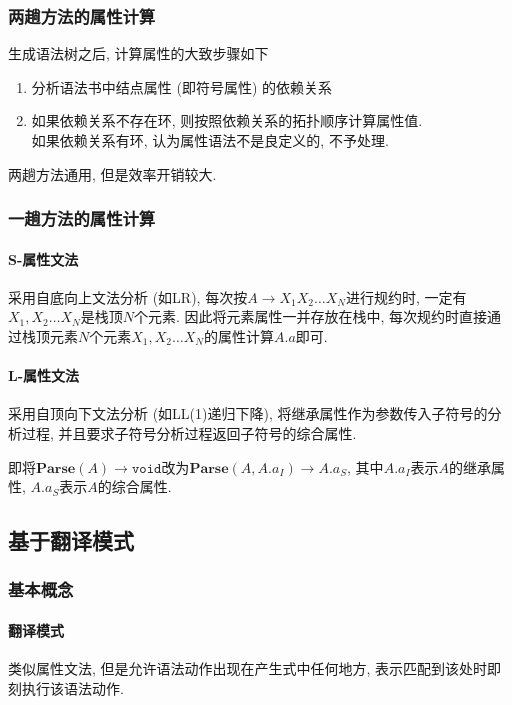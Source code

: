 \documentclass{ctexart}
\begin{document}
\subsubsection{两趟方法的属性计算}
    生成语法树之后, 计算属性的大致步骤如下
    \begin{enumerate}
        \item 分析语法书中结点属性 (即符号属性) 的依赖关系
        \item 如果依赖关系不存在环, 则按照依赖关系的拓扑顺序计算属性值.\\
        如果依赖关系有环, 认为属性语法不是良定义的, 不予处理.\par
    \end{enumerate}
    两趟方法通用, 但是效率开销较大.

\subsubsection{一趟方法的属性计算}
\paragraph{S-属性文法} 采用自底向上文法分析 (如LR), 每次按$A \to X_1 X_2 \ldots X_N$进行规约时, 一定有$X_1, X_2 \ldots X_N$是栈顶$N$个元素.
    因此将元素属性一并存放在栈中, 每次规约时直接通过栈顶元素$N$个元素$X_1, X_2\ldots X_N$的属性计算$A.a$即可.
\paragraph{L-属性文法} \label{onepass-l-attr-grammar} 采用自顶向下文法分析 (如LL(1)递归下降),
    将继承属性作为参数传入子符号的分析过程, 并且要求子符号分析过程返回子符号的综合属性.\par
    即将$\mathbf{Parse}(A) \to \mathtt{void}$改为$\mathbf{Parse}(A, A.a_I) \to A.a_S$, 其中$A.a_I$表示$A$的继承属性, $A.a_S$表示$A$的综合属性.

\subsection{基于翻译模式}
\subsubsection{基本概念}
\paragraph{翻译模式} 类似属性文法, 但是允许语法动作出现在产生式中任何地方, 表示匹配到该处时即刻执行该语法动作.
\end{document}
